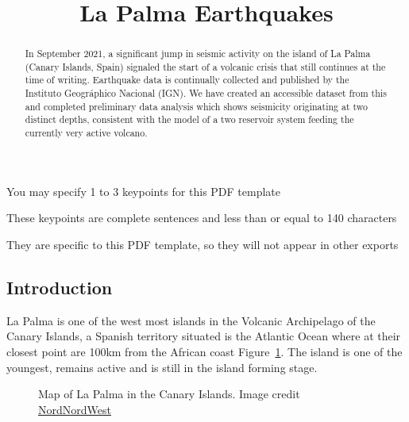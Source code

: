 \documentclass[
]{agujournal2019}
\begin{document}
\title{La Palma Earthquakes}


\begin{keypoints}
\item You may specify 1 to 3 keypoints for this PDF template \item These
keypoints are complete sentences and less than or equal to 140
characters \item They are specific to this PDF template, so they will
not appear in other exports 
\end{keypoints}

\begin{abstract}
In September 2021, a significant jump in seismic activity on the island
of La Palma (Canary Islands, Spain) signaled the start of a volcanic
crisis that still continues at the time of writing. Earthquake data is
continually collected and published by the Instituto Geográphico
Nacional (IGN). We have created an accessible dataset from this and
completed preliminary data analysis which shows seismicity originating
at two distinct depths, consistent with the model of a two reservoir
system feeding the currently very active volcano.
\end{abstract}



\subsection{Introduction}\label{introduction}

La Palma is one of the west most islands in the Volcanic Archipelago of
the Canary Islands, a Spanish territory situated is the Atlantic Ocean
where at their closest point are 100km from the African coast
Figure~\ref{fig-map}. The island is one of the youngest, remains active
and is still in the island forming stage.

\begin{figure}


\caption{\label{fig-map}Map of La Palma in the Canary Islands. Image
credit
\href{https://commons.wikimedia.org/w/index.php?curid=76638603}{NordNordWest}}

\end{figure}%
\end{document}
